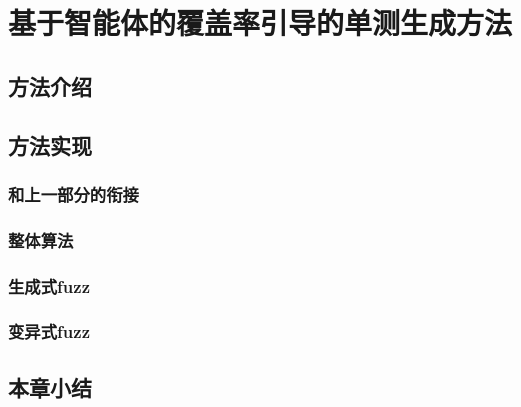 \chapter{基于智能体的覆盖率引导的单测生成方法}
    \section{方法介绍}
    \section{方法实现}
        \subsection{和上一部分的衔接}
        \subsection{整体算法}
        \subsection{生成式fuzz}
        \subsection{变异式fuzz}
    \section{本章小结}